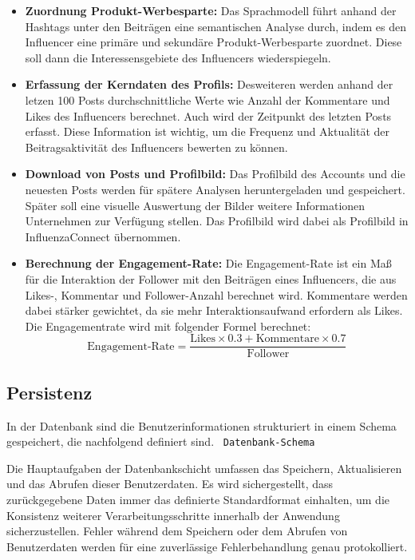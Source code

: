 \documentclass[conference,a4paper,flushend]{cs-techrep}
\begin{document}
\begin{itemize}

\item{\textbf{Zuordnung Produkt-Werbesparte:} Das Sprachmodell führt anhand der Hashtags unter den Beiträgen eine semantischen Analyse durch, indem es den Influencer eine primäre und sekundäre Produkt-Werbesparte zuordnet. Diese soll dann die Interessensgebiete des Influencers wiederspiegeln.}

\item{\textbf{Erfassung der Kerndaten des Profils:} Desweiteren werden anhand der letzen 100 Posts durchschnittliche Werte wie Anzahl der Kommentare und Likes des Influencers berechnet. Auch wird der Zeitpunkt des letzten Posts erfasst. Diese Information ist wichtig, um die Frequenz und Aktualität der Beitragsaktivität des Influencers bewerten zu können.}

\item{\textbf{Download von Posts und Profilbild:} Das Profilbild des Accounts und die neuesten Posts werden für spätere Analysen heruntergeladen und gespeichert. Später soll eine visuelle Auswertung der Bilder weitere Informationen Unternehmen zur Verfügung stellen. Das Profilbild wird dabei als Profilbild in InfluenzaConnect übernommen. }

\item{\textbf{Berechnung der Engagement-Rate:} Die Engagement-Rate ist ein Maß für die Interaktion der Follower mit den Beiträgen eines Influencers, die aus Likes-, Kommentar und Follower-Anzahl berechnet wird. Kommentare werden dabei stärker gewichtet, da sie mehr Interaktionsaufwand erfordern als Likes. Die Engagementrate wird mit folgender Formel berechnet: \[
\text{Engagement-Rate} = \frac{\text{Likes} \times 0.3 + \text{Kommentare} \times 0.7}{\text{Follower}} \] }
\end{itemize}



\subsection{Persistenz}

In der Datenbank sind die Benutzerinformationen strukturiert in einem Schema gespeichert, die nachfolgend definiert sind. 
\texttt{
Datenbank-Schema
}

Die Hauptaufgaben der Datenbankschicht umfassen das Speichern, Aktualisieren und das Abrufen dieser Benutzerdaten. Es wird sichergestellt, dass zurückgegebene Daten immer das definierte Standardformat einhalten, um die Konsistenz weiterer Verarbeitungsschritte innerhalb der Anwendung sicherzustellen. Fehler während dem Speichern oder dem Abrufen von Benutzerdaten werden für eine zuverlässige Fehlerbehandlung genau protokolliert.
\end{document}
